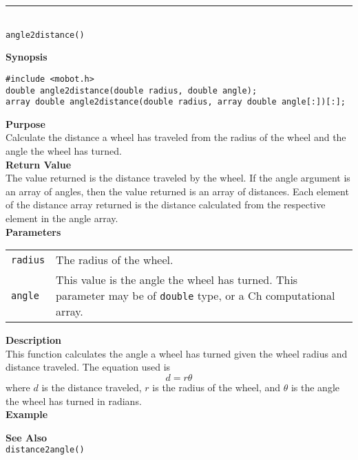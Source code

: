 \noindent
\vspace{5pt}
\rule{4.5in}{0.015in}\\
\noindent
{\LARGE \texttt{angle2distance()}}\\
{}

\noindent
{\bf Synopsis}
\vspace{-8pt}
\begin{verbatim}
#include <mobot.h>
double angle2distance(double radius, double angle);
array double angle2distance(double radius, array double angle[:])[:];
\end{verbatim}

\noindent
{\bf Purpose}\\
Calculate the distance a wheel has traveled from the radius of the wheel and
the angle the wheel has turned.\\

\noindent
{\bf Return Value}\\
The value returned is the distance traveled by the wheel. If the angle argument is an
array of angles, then the value returned is an array of distances. Each element
of the distance array returned is the distance calculated from the respective
element in the angle array.\\

\noindent
{\bf Parameters}
\vspace{-0.1in}
\begin{description}
\item               
\begin{tabular}{p{15 mm}p{145 mm}}
\texttt{radius} & The radius of the wheel. \\
\texttt{angle} & This value is the angle the wheel has turned. This parameter may be of \texttt{double} type, or a Ch computational array. \\
\end{tabular}
\end{description}

\noindent
{\bf Description}\\
This function calculates the angle a wheel has turned given the wheel 
radius and distance traveled. The equation used is
\begin{equation*}
d = r \theta
\end{equation*}
where $d$ is the distance traveled, $r$ is the radius of the wheel, and $\theta$ is
the angle the wheel has turned in radians.
\\

\noindent
{\bf Example}\\
\noindent

\noindent
{\bf See Also}\\
\texttt{distance2angle()}

